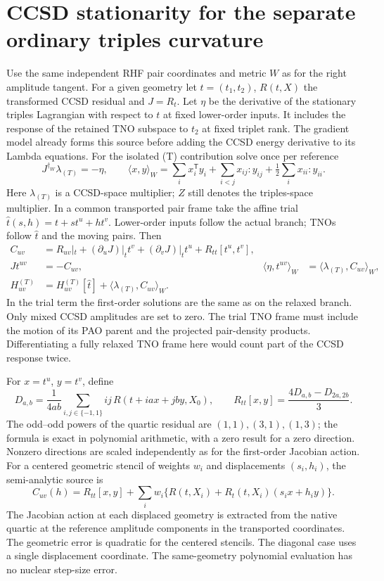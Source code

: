 \documentclass[11pt]{article}
\begin{document}
\section{CCSD stationarity for the separate ordinary triples curvature}
Use the same independent RHF pair coordinates and metric $W$ as for the
right amplitude tangent. For a given geometry let $t=(t_1,t_2)$,
$R(t,X)$ the transformed CCSD residual and $J=R_t$. Let
$\eta$ be the derivative of the stationary triples Lagrangian with respect
to $t$ at fixed lower-order inputs. It includes the response of the retained
TNO subspace to $t_2$ at fixed triplet rank. The gradient model already forms
this source before adding the CCSD energy derivative to its Lambda equations.
For the isolated (T) contribution solve once per reference
\begin{equation}
 J^{\dagger_W}\lambda_{(T)}=-\eta, \qquad
 \langle x,y\rangle_W=\sum_i x_i^{\mathsf T} y_i+
 \sum_{i<j}x_{ij}:y_{ij}+\tfrac12\sum_i x_{ii}:y_{ii}.
\end{equation}
Here $\lambda_{(T)}$ is a CCSD-space multiplier; $Z$ still denotes the
triples-space multiplier. In a common transported pair frame take the affine
trial $\widehat t(s,h)=t+s t^u+h t^v$. Lower-order inputs follow the actual
branch; TNOs follow $\widehat t$ and the moving pairs. Then
\begin{align}
 C_{uv} &= R_{uv}|_t + (\partial_u J)|_t t^v+
                (\partial_v J)|_t t^u+ R_{tt}[t^u,t^v],\\
 Jt^{uv}&=-C_{uv},&
 \langle \eta,t^{uv}\rangle_W &= \langle\lambda_{(T)}, C_{uv}\rangle_W,\\
 H_{uv}^{(T)}&=H_{uv}^{(T)}[\widehat t]
                          +\langle\lambda_{(T)},C_{uv}\rangle_W .
\end{align}
In the trial term the first-order solutions are the same as on the relaxed
branch. Only mixed CCSD amplitudes are set to zero. The trial TNO frame
must include the motion of its PAO parent and the projected pair-density
products. Differentiating a fully relaxed TNO frame here would count part
of the CCSD response twice.

For $x=t^u$, $y=t^v$, define
\begin{equation}
 D_{a,b}=\frac{1}{4ab}\sum_{i,j\in\{-1,1\}}ij\,
            R(t+iax+jby,X_0),\qquad
 R_{tt}[x,y]=\frac{4 D_{a,b}-D_{2a,2b}}{3}.
\end{equation}
The odd--odd powers of the quartic residual are $(1,1),(3,1),(1,3)$;
the formula is exact in polynomial arithmetic, with a zero result for a
zero direction. Nonzero directions are scaled independently as for the
first-order Jacobian action. For a centered geometric stencil of weights
$w_i$ and displacements $(s_i,h_i)$, the semi-analytic source is
\begin{equation}
 C_{uv}(h)= R_{tt}[x,y] + \sum_i w_i
       \{R(t,X_i)+R_t(t,X_i)(s_i x+h_i y)\}.
\end{equation}
The Jacobian action at each displaced geometry is extracted from the native
quartic at the reference amplitude components in the transported coordinates.
The geometric error is quadratic for the centered stencils. The diagonal
case uses a single displacement coordinate. The same-geometry polynomial
evaluation has no nuclear step-size error.
\end{document}
